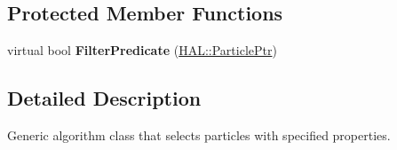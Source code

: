 \subsection*{Protected Member Functions}
\begin{DoxyCompactItemize}
\item 
\hypertarget{class_h_a_l_1_1_algorithms_1_1_select_particle_af19a208179b5c2da43bdd010ec7355cd}{virtual bool {\bfseries Filter\+Predicate} (\hyperlink{class_h_a_l_1_1_generic_particle}{H\+A\+L\+::\+Particle\+Ptr})}\label{class_h_a_l_1_1_algorithms_1_1_select_particle_af19a208179b5c2da43bdd010ec7355cd}

\end{DoxyCompactItemize}


\subsection{Detailed Description}
Generic algorithm class that selects particles with specified properties. 

